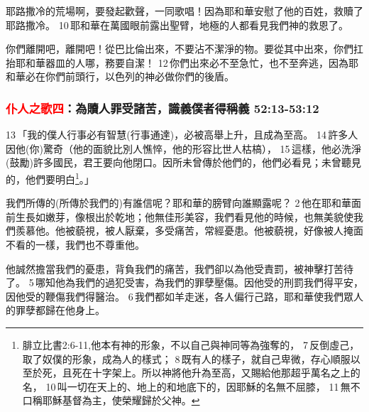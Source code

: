 耶路撒冷的荒場啊，要發起歡聲，一同歌唱！因為耶和華安慰了他的百姓，救贖了耶路撒冷。 10 耶和華在萬國眼前露出聖臂，地極的人都看見我們神的救恩了。

你們離開吧，離開吧！從巴比倫出來，不要沾不潔淨的物。要從其中出來，你們扛抬耶和華器皿的人哪，務要自潔！ 12 你們出來必不至急忙，也不至奔逃，因為耶和華必在你們前頭行，以色列的神必做你們的後盾。

\subsubsection{\textcolor{red}{仆人之歌四}：為贖人罪受諸苦，識義僕者得稱義 52:13-53:12}
13 「我的僕人行事必有智慧(行事通達)，必被高舉上升，且成為至高。 14 許多人因他(你)驚奇（他的面貌比別人憔悴，他的形容比世人枯槁）， 15 這樣，他必洗淨(鼓勵)許多國民，君王要向他閉口。因所未曾傳於他們的，他們必看見；未曾聽見的，他們要明白\footnote[1]{腓立比書2:6-11,他本有神的形象，不以自己與神同等為強奪的， 7 反倒虛己，取了奴僕的形象，成為人的樣式； 8 既有人的樣子，就自己卑微，存心順服以至於死，且死在十字架上。所以神將他升為至高，又賜給他那超乎萬名之上的名， 10 叫一切在天上的、地上的和地底下的，因耶穌的名無不屈膝， 11 無不口稱耶穌基督為主，使榮耀歸於父神。}。」

我們所傳的(所傳於我們的)有誰信呢？耶和華的膀臂向誰顯露呢？ 2 他在耶和華面前生長如嫩芽，像根出於乾地；他無佳形美容，我們看見他的時候，也無美貌使我們羨慕他。他被藐視，被人厭棄，多受痛苦，常經憂患。他被藐視，好像被人掩面不看的一樣，我們也不尊重他。

他誠然擔當我們的憂患，背負我們的痛苦，我們卻以為他受責罰，被神擊打苦待了。 5 哪知他為我們的過犯受害，為我們的罪孽壓傷。因他受的刑罰我們得平安，因他受的鞭傷我們得醫治。 6 我們都如羊走迷，各人偏行己路，耶和華使我們眾人的罪孽都歸在他身上。


